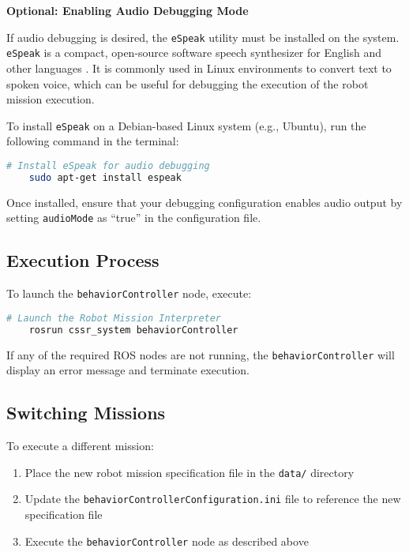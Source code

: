 \documentclass{CSSRforAfrica}
\begin{document}
\vspace{0.5em}
\noindent\textbf{Optional: Enabling Audio Debugging Mode}

\noindent If audio debugging is desired, the \texttt{\small eSpeak} utility must be installed on the system. \texttt{\small eSpeak} is a compact, open-source software speech synthesizer for English and other languages \cite{eSpeakWebsite}. It is commonly used in Linux environments to convert text to spoken voice, which can be useful for debugging the execution of the robot mission execution.

\vspace{0.3em}
\noindent To install \texttt{\small eSpeak} on a Debian-based Linux system (e.g., Ubuntu), run the following command in the terminal:
\begin{lstlisting}[style=withoutNumbering, language=bash]
    # Install eSpeak for audio debugging
    sudo apt-get install espeak
\end{lstlisting}

\noindent Once installed, ensure that your debugging configuration enables audio output by setting \texttt{\small audioMode} as ``true'' in the configuration file.

\subsection{Execution Process}
To launch the \texttt{\small behaviorController} node, execute:
\begin{lstlisting}[style=withoutNumbering, language=bash]
    # Launch the Robot Mission Interpreter
    rosrun cssr_system behaviorController
\end{lstlisting}

If any of the required ROS nodes are not running, the \texttt{\small behaviorController} will display an error message and terminate execution.
\subsection{Switching Missions}
To execute a different mission:
\begin{enumerate}
\item Place the new robot mission specification file in the \texttt{\small data/} directory
\item Update the \texttt{\small behaviorControllerConfiguration.ini} file to reference the new specification file
\item Execute the \texttt{\small behaviorController} node as described above
\end{enumerate}
\end{document}
